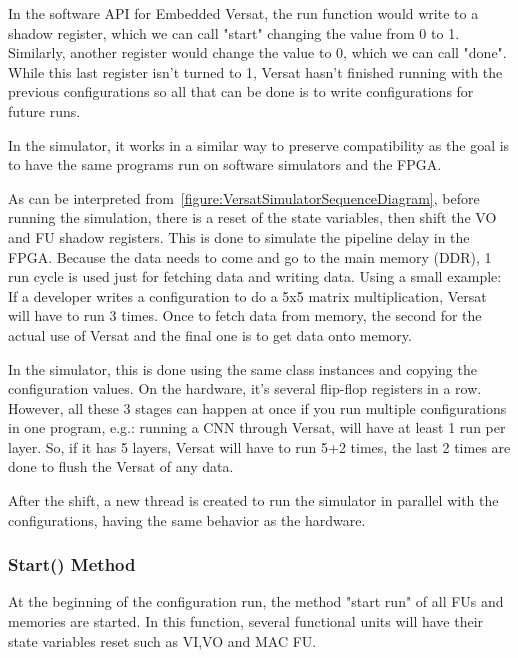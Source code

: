 \documentclass[conference]{IEEEtran}
\begin{document}
In the software API for Embedded Versat, the run function would write to a shadow register,
which we can call "start" changing the value from 0 to 1. 
Similarly, another register would
change the value to 0, which we can call "done". While this last register isn't turned to 1, 
Versat hasn't finished running with the 
previous configurations so all that can be done is to write
configurations for future runs.

In the simulator, it works in a similar way to preserve compatibility 
as the goal is to have the same
programs run on software simulators and the FPGA.

% 

As can be interpreted from~\ref{figure:VersatSimulatorSequenceDiagram}, before running the simulation, there is a reset of the state variables, then shift the 
VO and FU shadow registers.
This is done to simulate the pipeline delay in the FPGA. 
Because the data needs to come and go to the main memory (DDR),
1 run cycle is used just for fetching data and writing data. 
Using a small example:
If a developer writes a configuration to do a 5x5 matrix multiplication, 
Versat will have to run 3 times.
Once to fetch data from memory, the second for the actual use of Versat 
and the final one is to get data onto memory.

In the simulator, this is done using the same class instances and 
copying the configuration values. On the hardware, it's several flip-flop registers in a row.
However, all these 3 stages can happen at once if you run multiple configurations in one program, 
e.g.: running a CNN
through Versat, will have at least 1 run per layer. 
So, if it has 5 layers, Versat will have to run 5+2 times, the last 2 times are done to
flush the Versat of any data.

After the shift, a new thread is created to run the simulator in parallel 
with the configurations,
having the same behavior as the hardware.

\subsubsection{Start() Method}

At the beginning of the configuration run, the method "start run" of 
all FUs and memories are started.
In this function, several functional units will have their state variables 
reset such as VI,VO and MAC FU.
\end{document}
